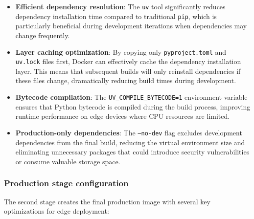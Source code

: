 \begin{itemize}
    \item \textbf{Efficient dependency resolution}: The \texttt{uv} tool significantly reduces dependency installation time compared to traditional \texttt{pip}, which is particularly beneficial during development iterations when dependencies may change frequently.
    
    \item \textbf{Layer caching optimization}: By copying only \texttt{pyproject.toml} and \texttt{uv.lock} files first, Docker can effectively cache the dependency installation layer. This means that subsequent builds will only reinstall dependencies if these files change, dramatically reducing build times during development.
    
    \item \textbf{Bytecode compilation}: The \texttt{UV\_COMPILE\_BYTECODE=1} environment variable ensures that Python bytecode is compiled during the build process, improving runtime performance on edge devices where CPU resources are limited.
    
    \item \textbf{Production-only dependencies}: The \texttt{--no-dev} flag excludes development dependencies from the final build, reducing the virtual environment size and eliminating unnecessary packages that could introduce security vulnerabilities or consume valuable storage space.
\end{itemize}

\subsubsection{Production stage configuration}

The second stage creates the final production image with several key optimizations for edge deployment:

